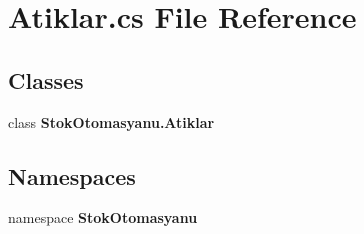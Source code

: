 \section{Atiklar.\+cs File Reference}
\label{_atiklar_8cs}
\subsection*{Classes}
\begin{DoxyCompactItemize}
\item 
class \textbf{ Stok\+Otomasyanu.\+Atiklar}
\end{DoxyCompactItemize}
\subsection*{Namespaces}
\begin{DoxyCompactItemize}
\item 
namespace \textbf{ Stok\+Otomasyanu}
\end{DoxyCompactItemize}
